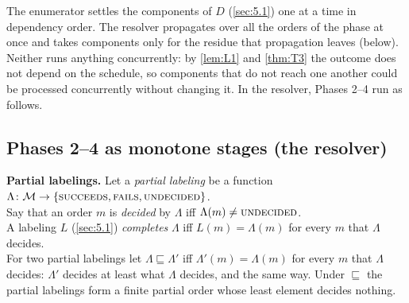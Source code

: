 \documentclass[12pt,a4paper]{article}
\begin{document}
The enumerator settles the components of $D$ (\cref{sec:5.1}) one at a time in dependency order.
The resolver propagates over all the orders of the phase at once and takes components only for the residue that propagation leaves (below).
Neither runs anything concurrently: by \cref{lem:L1} and \cref{thm:T3} the outcome does not depend on the schedule, so components that do not reach one another could be processed concurrently without changing it.
In the resolver, Phases 2--4 run as follows.

\subsection*{Phases 2--4 as monotone stages (the resolver)}\label{sec:6.stages}

\textbf{Partial labelings.}
Let a \emph{partial labeling} be a function $\Lambda\colon \mathcal{M} \to \{\textsc{succeeds}, \textsc{fails}, \textsc{undecided}\}$.\\
Say that an order $m$ is \emph{decided} by $\Lambda$ iff $\Lambda(m) \ne \textsc{undecided}$.\\
A labeling $L$ (\cref{sec:5.1}) \emph{completes} $\Lambda$ iff $L(m) = \Lambda(m)$ for every $m$ that $\Lambda$ decides.\\
For two partial labelings let $\Lambda \sqsubseteq \Lambda'$ iff $\Lambda'(m) = \Lambda(m)$ for every $m$ that $\Lambda$ decides: $\Lambda'$ decides at least what $\Lambda$ decides, and the same way.
Under $\sqsubseteq$ the partial labelings form a finite partial order whose least element decides nothing.
\end{document}
